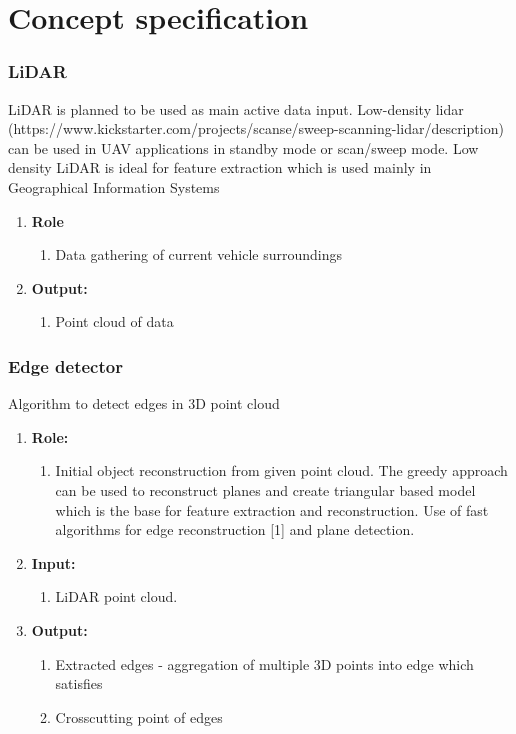 \section{Concept specification}
\subsubsection{LiDAR}
LiDAR is planned to be used as main active data input. Low-density lidar (https://www.kickstarter.com/projects/scanse/sweep-scanning-lidar/description) can be used in UAV applications 
in standby mode or scan/sweep mode.
Low density LiDAR is ideal for feature extraction which is used mainly in Geographical Information Systems

\begin{enumerate}[]
	\item \textbf{Role}
	    \begin{enumerate}[]
		    \item Data gathering of current vehicle surroundings
		\end{enumerate}
	\item \textbf{Output:}
	    \begin{enumerate}[1.]
		\item Point cloud of data
		\end{enumerate}
\end{enumerate}


\subsubsection{Edge detector}
Algorithm to detect edges in 3D point cloud
\begin{enumerate}[]
	\item \textbf{Role:}
		\begin{enumerate}[]
		\item Initial object reconstruction from given point cloud. The greedy approach can be used to reconstruct planes and create triangular based model which is the base for feature extraction and reconstruction. Use of fast algorithms for edge reconstruction [1] and plane detection.
		\end{enumerate}
	\item \textbf{Input:}
		\begin{enumerate}[1.]
		\item LiDAR point cloud.
		\end{enumerate}	
	\item \textbf{Output:}
		\begin{enumerate}[1.]
		\item Extracted edges - aggregation of multiple 3D points into edge which satisfies 
		\item Crosscutting point of edges
		\end{enumerate}
\end{enumerate}
	
